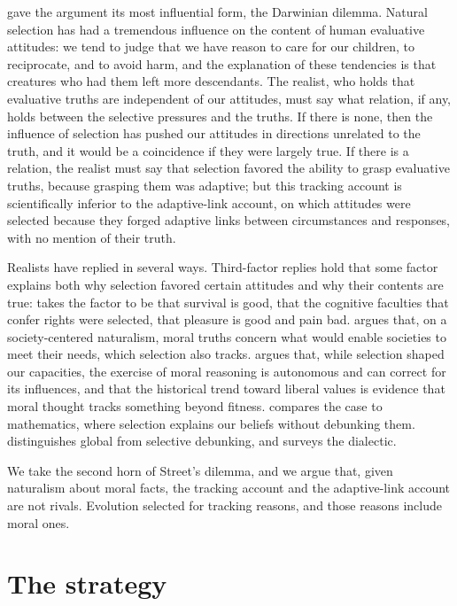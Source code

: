 \documentclass{situationist-preprint}
\begin{document}
\citet{Street2006} gave the argument its most influential form, the Darwinian dilemma. Natural selection has had a tremendous influence on the content of human evaluative attitudes: we tend to judge that we have reason to care for our children, to reciprocate, and to avoid harm, and the explanation of these tendencies is that creatures who had them left more descendants. The realist, who holds that evaluative truths are independent of our attitudes, must say what relation, if any, holds between the selective pressures and the truths. If there is none, then the influence of selection has pushed our attitudes in directions unrelated to the truth, and it would be a coincidence if they were largely true. If there is a relation, the realist must say that selection favored the ability to grasp evaluative truths, because grasping them was adaptive; but this tracking account is scientifically inferior to the adaptive-link account, on which attitudes were selected because they forged adaptive links between circumstances and responses, with no mention of their truth.

Realists have replied in several ways. Third-factor replies hold that some factor explains both why selection favored certain attitudes and why their contents are true: \citet{Enoch2010} takes the factor to be that survival is good, \citet{Wielenberg2010} that the cognitive faculties that confer rights were selected, \citet{Skarsaune2011} that pleasure is good and pain bad. \citet{Copp2008} argues that, on a society-centered naturalism, moral truths concern what would enable societies to meet their needs, which selection also tracks. \citet{FitzPatrick2015} argues that, while selection shaped our capacities, the exercise of moral reasoning is autonomous and can correct for its influences, and \citet{Huemer2016} that the historical trend toward liberal values is evidence that moral thought tracks something beyond fitness. \citet{ClarkeDoane2012} compares the case to mathematics, where selection explains our beliefs without debunking them. \citet{Kahane2011} distinguishes global from selective debunking, and \citet{Vavova2015} surveys the dialectic.

We take the second horn of Street's dilemma, and we argue that, given naturalism about moral facts, the tracking account and the adaptive-link account are not rivals. Evolution selected for tracking reasons, and those reasons include moral ones.

\section{The strategy}
\end{document}
